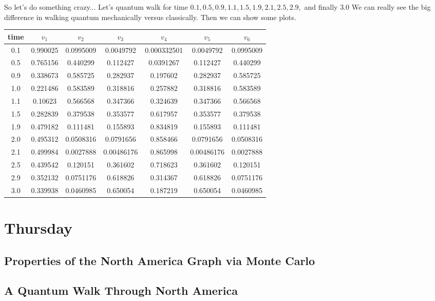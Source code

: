 \documentclass{article}
\theoremstyle{definition}
\theoremstyle{remark}
\begin{document}
So let's do something crazy... Let's quantum walk for time $0.1, 0.5, 0.9, 1.1, 1.5, 1.9, 2.1, 2.5, 2.9,$ and finally $3.0$ We can really see the big difference in walking quantum mechanically versus classically. Then we can show some plots.

\begin{tabular}{c | c | c | c | c | c | c }
time & $v_1$ & $v_2$ & $v_3$ & $v_4$ & $v_5$ & $v_6$\\ 
\hline
0.1 & 0.990025 & 0.0995009 & 0.0049792 &  0.000332501 & 0.0049792  & 0.0995009\\
0.5 & 0.765156 & 0.440299  & 0.112427  &  0.0391267   & 0.112427   & 0.440299\\
0.9 & 0.338673 & 0.585725  & 0.282937  &  0.197602    & 0.282937   & 0.585725\\
1.0 & 0.221486 & 0.583589  & 0.318816  &  0.257882    & 0.318816   & 0.583589\\
1.1 & 0.10623  & 0.566568  & 0.347366  &  0.324639    & 0.347366   & 0.566568\\
1.5 & 0.282839 & 0.379538  & 0.353577  &  0.617957    & 0.353577   & 0.379538\\
1.9 & 0.479182 & 0.111481  & 0.155893  &  0.834819    & 0.155893   & 0.111481\\
2.0 & 0.495312 & 0.0508316 & 0.0791656 &  0.858466    & 0.0791656  & 0.0508316\\
2.1 & 0.499984 & 0.0027888 & 0.00486176&  0.865998    & 0.00486176 & 0.0027888\\
2.5 & 0.439542 & 0.120151  & 0.361602  &  0.718623    & 0.361602   & 0.120151\\
2.9 & 0.352132 & 0.0751176 & 0.618826  &  0.314367    & 0.618826   & 0.0751176\\
3.0 & 0.339938 & 0.0460985 & 0.650054  &  0.187219    & 0.650054   & 0.0460985\\
\end{tabular}



\section{Thursday}
\subsection{Properties of the North America Graph via Monte Carlo}
\subsection{A Quantum Walk Through North America}
\end{document}
